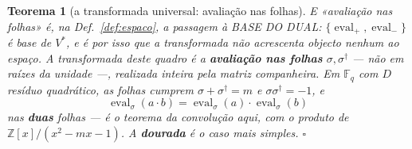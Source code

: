 \documentclass[11pt,a4paper]{article}
\newtheorem{teorema}{Teorema}
\newcommand{\dg}{^{\dagger}}
\begin{document}
\begin{teorema}[a transformada universal: avaliação nas folhas]\label{thm:espectro}
\emph{E «avaliação nas folhas» é, na Def.~\ref{def:espaco}, a passagem à BASE DO DUAL}:
$\{\operatorname{eval}_{+},\operatorname{eval}_{-}\}$ é base de $V^{\ast}$, e é por isso
que a transformada não acrescenta objecto nenhum ao espaço.
A transformada deste quadro é a \textbf{avaliação nas folhas} $\sigma,\sigma\dg$
--- não em raízes da unidade ---, realizada \emph{inteira} pela matriz
companheira. Em $\mathbb{F}_q$ com $D$ resíduo quadrático, as folhas cumprem
$\sigma+\sigma\dg=m$ e $\sigma\sigma\dg=-1$, e
\[
\boxed{\;\operatorname{eval}_{\sigma}(a\cdot b)
=\operatorname{eval}_{\sigma}(a)\cdot\operatorname{eval}_{\sigma}(b)\;}
\]
nas \textbf{duas} folhas --- é o teorema da convolução aqui, com o produto de
$\mathbb{Z}[x]/(x^{2}-mx-1)$. A \textbf{dourada} é o caso mais simples. $\square$
\end{teorema}
\end{document}

